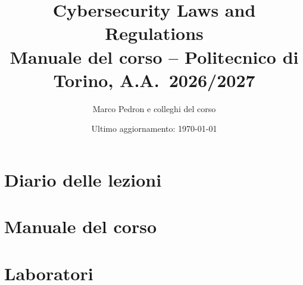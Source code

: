 \documentclass[11pt,a4paper]{report}
\title{Cybersecurity Laws and Regulations\\[4pt]
  \large Manuale del corso -- Politecnico di Torino, A.A.~2026/2027}
\author{Marco Pedron e colleghi del corso}
\date{Ultimo aggiornamento: \today}
\begin{document}
\maketitle
\tableofcontents


\part{Diario delle lezioni}


















\part{Manuale del corso}










\part{Laboratori}






\end{document}
